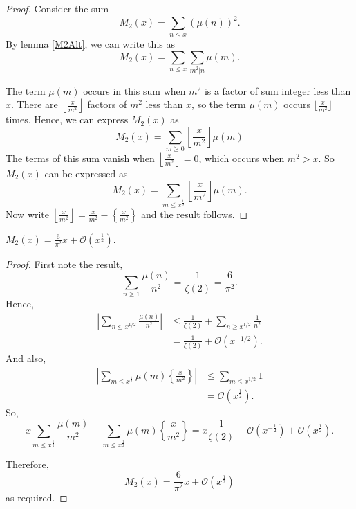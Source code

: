 \documentclass{unswmaths}
\begin{document}
\begin{proof}
    Consider the sum
    \begin{equation*}
        M_2(x) = \sum_{n\leq x} (\mu(n))^2.
    \end{equation*}
    By lemma \ref{M2Alt}, we can write this as
    \begin{equation*}
        M_2(x) = \sum_{n\leq x}\sum_{m^2|n}\mu(m).
    \end{equation*}
    
    The term $\mu(m)$ occurs in this sum when $m^2$ is a factor of sum integer
    less than $x$. There are $\left\lfloor \frac{x}{m^2}\right\rfloor$ factors of $m^2$
    less than $x$, so the term $\mu(m)$ occurs $\lfloor \frac{x}{m^2}\rfloor$
    times. Hence, we can express $M_2(x)$ as
    \begin{equation*}
        M_2(x) = \sum_{m\geq0} \left\lfloor\frac{x}{m^2}\right\rfloor\mu(m)
    \end{equation*}
    The terms of this sum vanish when $\left\lfloor \frac{x}{m^2}\right\rfloor = 0$,
    which occurs when $m^2 > x$. So $M_2(x)$ can be expressed as
    \begin{equation*}
        M_2(x) = \sum_{m\leq x^\frac{1}{2}}\left\lfloor\frac{x}{m^2}\right\rfloor\mu(m).
    \end{equation*}
    Now write $\left\lfloor\frac{x}{m^2}\right\rfloor = \frac{x}{m^2}-\left\{\frac{x}{m^2}\right\}$
    and the result follows.
\end{proof}
\begin{theorem}
    $M_2(x) = \frac{6}{\pi^2}x+\mathcal{O}(x^\frac{1}{2})$.
\end{theorem}
\begin{proof}
    First note the result,
    \begin{equation*}
        \sum_{n\geq 1} \frac{\mu(n)}{n^2} = \frac{1}{\zeta(2)} = \frac{6}{\pi^2}.
    \end{equation*}
    Hence,
    \begin{align*}
        |\sum_{n\leq x^{1/2}} \frac{\mu(n)}{n^2}| &\leq \frac{1}{\zeta(2)}+\sum_{n\geq x^{1/2}} \frac{1}{n^2}\\
        &= \frac{1}{\zeta(2)}+\mathcal{O}(x^{-1/2}).
    \end{align*}
    And also,
    \begin{align*}
        |\sum_{m\leq x^\frac{1}{2}}\mu(m)\left\{\frac{x}{m^2}\right\}| &\leq \sum_{m\leq x^{1/2}} 1\\
        &= \mathcal{O}(x^\frac{1}{2}).
    \end{align*}
    So,
    \begin{equation*}
        x\sum_{m\leq x^\frac{1}{2}} \frac{\mu(m)}{m^2}-\sum_{m\leq x^\frac{1}{2}}\mu(m)\left\{\frac{x}{m^2}\right\} = x\frac{1}{\zeta(2)}+\mathcal{O}(x^{-\frac{1}{2}})+\mathcal{O}(x^\frac{1}{2}).
    \end{equation*}
    
    Therefore,
    \begin{equation*}
        M_2(x) = \frac{6}{\pi^2}x+\mathcal{O}(x^\frac{1}{2})
    \end{equation*}
    as required.
    
    
\end{proof}
\end{document}
